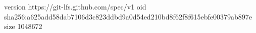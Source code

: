 version https://git-lfs.github.com/spec/v1
oid sha256:a625add58dab7106d3c823ddbd9a0d54ed210bd8f62f8f615ebfe00379ab897e
size 1048672
